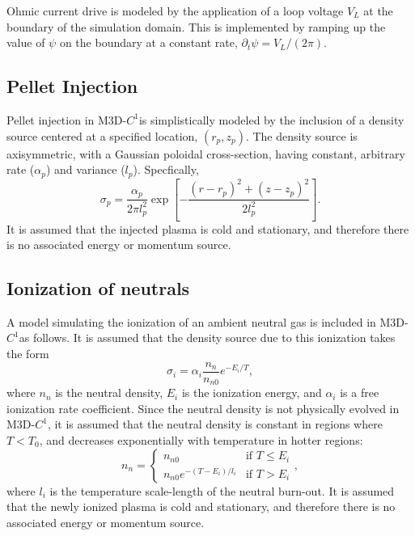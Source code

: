 \documentclass[letterpaper]{book}
\newcommand{\codename}{M3D-$C^1$}
\begin{document}
Ohmic current drive is modeled by the application of a
loop voltage $V_L$ at the boundary of the simulation domain.  This is
implemented by ramping up the value of $\psi$ on the boundary at a
constant rate, $\partial_t \psi = V_L/(2 \pi)$.

\subsection{Pellet Injection \label{sec:pellet_injection}}

Pellet injection in \codename is simplistically modeled by the
inclusion of a density source centered at a specified location, $(r_p,
z_p)$.  The density source is axisymmetric, with a Gaussian poloidal
cross-section, having constant, arbitrary rate ($\alpha_p$) and
variance ($l_p$).  Specfically,
\begin{equation}
  \sigma_p = \frac{\alpha_{p}}{2 \pi l_{p}^2}
  \exp \left[ -\frac{(r-r_p)^2 + (z-z_p)^2}{2 l_p^2}\right].
\end{equation}
It is assumed that the injected plasma is cold and stationary, and
therefore there is no associated energy or momentum source.


\subsection{Ionization of neutrals \label{sec:ionization}}

A model simulating the ionization of an ambient neutral gas is
included in \codename as follows.  It is assumed that the density
source due to this ionization takes the form
\begin{equation}
  \sigma_i = \alpha_i \frac{n_n}{n_{n 0}} e^{-E_i / T},
\end{equation}
where $n_n$ is the neutral density, $E_i$ is the ionization energy,
and $\alpha_i$ is a free ionization rate coefficient.  Since the
neutral density is not physically evolved in \codename, it is assumed
that the neutral density is constant in regions where $T < T_0$, and
decreases exponentially with temperature in hotter regions:
\begin{equation}
  n_n =
  \begin{cases}
    n_{n 0} & \text{if $T \le E_i$}\\
    n_{n 0} e^{-(T - E_i) / l_i} & \text{if $T > E_i$}
  \end{cases},
\end{equation}
where $l_i$ is the temperature scale-length of the neutral burn-out.
It is assumed that the newly ionized plasma is cold and stationary,
and therefore there is no associated energy or momentum source.
\end{document}

